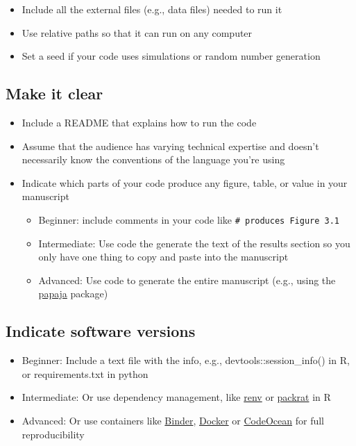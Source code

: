 \documentclass[
  oneside]{book}
\providecommand{\tightlist}{%
  \setlength{\itemsep}{0pt}\setlength{\parskip}{0pt}}
\begin{document}
\begin{itemize}
\tightlist
\item
  Include all the external files (e.g., data files) needed to run it
\item
  Use relative paths so that it can run on any computer
\item
  Set a seed if your code uses simulations or random number generation
\end{itemize}

\hypertarget{make-it-clear}{%
\subsection{Make it clear}\label{make-it-clear}}

\begin{itemize}
\tightlist
\item
  Include a README that explains how to run the code
\item
  Assume that the audience has varying technical expertise and doesn't necessarily know the conventions of the language you're using
\item
  Indicate which parts of your code produce any figure, table, or value in your manuscript

  \begin{itemize}
  \tightlist
  \item
    {Beginner}: include comments in your code like \texttt{\#\ produces\ Figure\ 3.1}
  \item
    {Intermediate}: Use code the generate the text of the results section so you only have one thing to copy and paste into the manuscript
  \item
    {Advanced}: Use code to generate the entire manuscript (e.g., using the \href{http://frederikaust.com/papaja_man/}{papaja} package)
  \end{itemize}
\end{itemize}

\hypertarget{indicate-software-versions}{%
\subsection{Indicate software versions}\label{indicate-software-versions}}

\begin{itemize}
\tightlist
\item
  {Beginner}: Include a text file with the info, e.g., devtools::session\_info() in R, or requirements.txt in python
\item
  {Intermediate}: Or use dependency management, like \href{https://rstudio.github.io/renv/articles/renv.html}{renv} or \href{https://rstudio.github.io/packrat/}{packrat} in R
\item
  {Advanced}: Or use containers like \href{https://mybinder.org/}{Binder}, \href{https://www.docker.com/}{Docker} or \href{https://codeocean.com/}{CodeOcean} for full reproducibility
\end{itemize}
\end{document}
